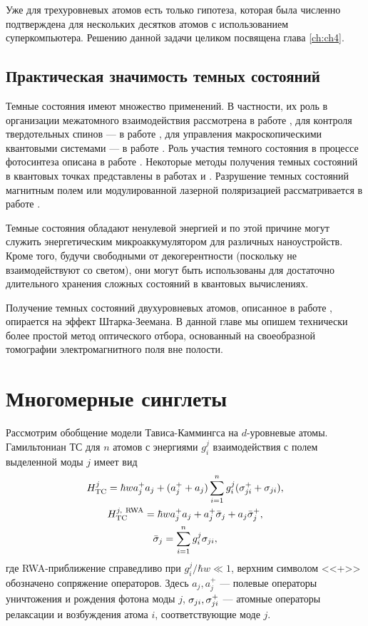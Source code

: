 Уже для трехуровневых атомов есть только гипотеза, которая была численно подтверждена для нескольких десятков атомов с использованием суперкомпьютера. Решению данной задачи целиком посвящена глава \ref{ch:ch4}.

\subsection{Практическая значимость темных состояний}\label{subsec:ch3/subsect2}
Темные состояния имеют множество применений. В частности, их роль в организации межатомного взаимодействия рассмотрена в работе \cite{andre}, для контроля твердотельных спинов --- в работе \cite{hansom}, для управления макроскопическими квантовыми системами --- в работе \cite{dark_states_bose_einstein}. Роль участия темного состояния в процессе фотосинтеза описана в работе \cite{dark_states_photosynthesis}. Некоторые методы получения темных состояний в квантовых точках представлены в работах \cite{poltl} и \cite{tanamoto}. Разрушение темных состояний магнитным полем или модулированной лазерной поляризацией рассматривается в работе \cite{destabilization_dark_states}.

Темные состояния обладают ненулевой энергией и по этой причине могут служить энергетическим микроаккумулятором для различных
наноустройств. Кроме того, будучи свободными от декогерентности (поскольку не взаимодействуют со светом), они могут быть использованы для достаточно длительного хранения сложных состояний в квантовых вычислениях.

Получение темных состояний двухуровневых атомов, описанное в работе \cite{tanamoto}, опирается на эффект Штарка-Зеемана. В данной главе мы опишем технически более простой метод оптического отбора, основанный на своеобразной томографии электромагнитного поля вне полости.

\section{Многомерные синглеты}\label{sec:ch3/sect2}
Рассмотрим обобщение модели Тависа-Каммингса на $d$-уровневые атомы. Гамильтониан ТС для $n$ атомов с энергиями $g^{j}_{i}$ взаимодействия с полем выделенной моды $j$ имеет вид
\begin{gather}
	H^j_{\text{TC}} = \hbar w a_{j}^{+}a_j + (a_{j}^{+} + a_{j})\sum\limits_{i=1}^{n}g^{j}_{i}(\sigma_{ji}^{+} + \sigma_{ji}),\notag\\
	H^{j,\ \text{RWA}}_{\text{TC}} = \hbar w a_{j}^{+}a_{j} + a_{j}^{+}\bar{\sigma}_{j} + a_{j}\bar{\sigma}_{j}^{+},\\
	\bar{\sigma}_{j} = \sum\limits_{i=1}^ng^{j}_{i}\sigma_{ji},\notag
\end{gather}
где RWA-приближение \cite{ozhigov_qq, rwa_1, rwa_2} справедливо при $g^{j}_{i}/\hbar w\ll 1$, верхним символом <<+>> обозначено сопряжение операторов. Здесь $a_{j},a_{j}^{+}$ --- полевые операторы уничтожения и рождения фотона моды $j$, $\sigma_{ji},\sigma_{ji}^{+}$ --- атомные операторы релаксации и возбуждения атома $i$, соответствующие моде $j$.


